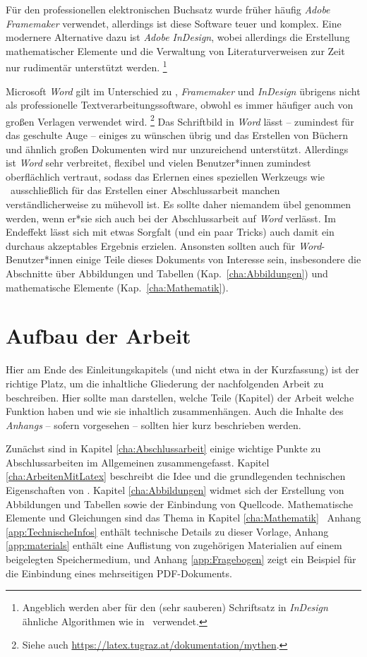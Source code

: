 Für den professionellen elektronischen Buchsatz wurde früher häufig
\emph{Adobe Framemaker} verwendet, allerdings ist diese Software teuer und
komplex. Eine modernere Alternative dazu ist \emph{Adobe InDesign}, wobei
allerdings die Erstellung mathematischer Elemente und die Verwaltung von
Literaturverweisen zur Zeit nur rudimentär unterstützt werden.%
\footnote{Angeblich werden aber für den (sehr sauberen) Schriftsatz in
\emph{InDesign} ähnliche Algorithmen wie in \latex\ verwendet.}

Microsoft \emph{Word} gilt im Unterschied zu \latex, \emph{Framemaker} und
\emph{InDesign} übrigens nicht als professionelle Textverarbeitungssoftware,
obwohl es immer häufiger auch von großen Verlagen verwendet wird.%
\footnote{Siehe auch \url{https://latex.tugraz.at/dokumentation/mythen}.}
Das Schriftbild in \emph{Word} lässt -- zumindest für das geschulte Auge --
einiges zu wünschen übrig und das Erstellen von Büchern und ähnlich großen
Dokumenten wird nur unzureichend unterstützt. Allerdings ist \emph{Word} sehr
verbreitet, flexibel und vielen Benutzer*innen zumindest oberflächlich
vertraut, sodass das Erlernen eines speziellen Werkzeugs wie \latex\
ausschließlich für das Erstellen einer Abschlussarbeit manchen
verständlicherweise zu mühevoll ist. Es sollte daher niemandem übel genommen
werden, wenn er*sie sich auch bei der Abschlussarbeit auf \emph{Word}
verlässt. Im Endeffekt lässt sich mit etwas Sorgfalt (und ein paar Tricks)
auch damit ein durchaus akzeptables Ergebnis erzielen. Ansonsten sollten auch
für \emph{Word}-Benutzer*innen einige Teile dieses Dokuments von Interesse
sein, insbesondere die Abschnitte über Abbildungen und Tabellen
(Kap.~\ref{cha:Abbildungen}) und mathematische Elemente
(Kap.~\ref{cha:Mathematik}).


\section{Aufbau der Arbeit}

Hier am Ende des Einleitungskapitels (und nicht etwa in der Kurzfassung) ist
der richtige Platz, um die inhaltliche Gliederung der nachfolgenden Arbeit zu
beschreiben. Hier sollte man darstellen, welche Teile (Kapitel) der Arbeit
welche Funktion haben und wie sie inhaltlich zusammenhängen. Auch die Inhalte
des \emph{Anhangs} -- sofern vorgesehen -- sollten hier kurz beschrieben werden.

Zunächst sind in Kapitel \ref{cha:Abschlussarbeit} einige wichtige Punkte zu
Abschlussarbeiten im Allgemeinen zusammengefasst. Kapitel
\ref{cha:ArbeitenMitLatex} beschreibt die Idee und die grundlegenden
technischen Eigenschaften von \latex. Kapitel \ref{cha:Abbildungen} widmet
sich der Erstellung von Abbildungen und Tabellen sowie der Einbindung von
Quellcode. Mathematische Elemente und Gleichungen sind das Thema in Kapitel
\ref{cha:Mathematik} \usw\ Anhang \ref{app:TechnischeInfos} enthält
technische Details zu dieser Vorlage, Anhang \ref{app:materials} enthält eine
Auflistung von zugehörigen Materialien auf einem beigelegten Speichermedium,
und Anhang \ref{app:Fragebogen} zeigt ein Beispiel für die Einbindung eines
mehrseitigen PDF-Dokuments.
